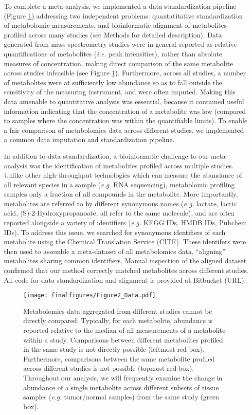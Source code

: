 \documentclass[10pt]{article}
\begin{document}
To complete a meta-analysis, we implemented a data standardization pipeline (Figure \ref{fig:Fig2}) addressing two independent problems: quantatitative standardization of metabolomic measurements, and bioinformatic alignment of metabolites profiled across many studies (see Methods for detailed description). Data generated from mass spectrometry studies were in general reported as relative quantifications of metabolites (\textit{i.e.} peak intensities), rather than absolute measures of concentration. making direct comparison of the same metabolite across studies infeasible (see Figure \ref{fig:Fig2}). Furthermore, across all studies, a number of metabolites were at sufficiently low abundance so as to fall outside the sensitivity of the measuring instrument, and were often imputed. Making this data amenable to quantitative analysis was essential, because it contained useful information indicating that the concentration of a metabolite was low (compared to samples where the concentration was within the quantifiable limits). To enable a fair comparison of metabolomics data across different studies, we implemented a common data imputation and standardization pipeline.

In addition to data standardization, a bioinformatic challenge to our meta-analysis was the identification of metabolites profiled across multiple studies. Unlike other high-throughput technologies which can measure the abundance of all relevant species in a sample (\textit{e.g.} RNA sequencing), metabolomic profiling samples only a fraction of all compounds in the metabolite. More importantly, metabolites are referred to by different synonymous names (\textit{e.g.} lactate, lactic acid, (S)-2-Hydroxypropanoate, all refer to the same molecule), and are often reported alongside a variety of identifiers (\textit{e.g.} KEGG IDs, HMDB IDs, Pubchem IDs). To address this issue, we searched for synonymous identifiers of each metabolite using the Chemical Translation Service (CITE). These identifers were then used to assemble a meta-dataset of all metabolomics data, ``aligning'' metabolites sharing common identifiers. Manual inspection of the aligned dataset confirmed that our method correctly matched metabolites across different studies. All code for data standardization and alignment is provided at Bitbucket (URL).

\begin{figure}[ht!]
  \centering
     \texttt{[image: finalfigures/Figure2\_Data.pdf]}
  \caption{Metabolomics data aggregated from different studies cannot be directly compared. Typically, for each metabolite, abundance is reported relative to the median of all measurements of a metabolite within a study. Comparisons between different metabolites profiled in the same study is not directly possible (leftmost red box). Furthermore, comparisons between the same metabolite profiled across different studies is not possible	(topmost red box). Throughout our analysis, we will frequently examine the change in abundance of a single metabolite across different subsets of tissue samples (\textit{e.g.} tumor/normal samples) from the same study (green box). }
     \label{fig:Fig2}
\end{figure}
\end{document}
